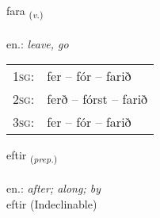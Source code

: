 \documentclass[frontgrid, backgrid]{flacards}\usepackage[]{graphicx}\usepackage[]{xcolor}
\begin{document}
\renewcommand{\flhead}{\vskip5pt \fboxsep=0pt {\small\bfseries\footnotesize Sagnorð | Verb}}
\renewcommand{\fcfoot}{\vskip5pt \fboxsep=0pt \hspace{2pt}{\small\bfseries\footnotesize 1K}}

\renewcommand{\blhead}{\vskip5pt {\small\bfseries\footnotesize Sagnorð | Verb }}
\renewcommand{\bcfoot}{\vskip5pt \hspace{2pt}{\small\bfseries\footnotesize 1K}}


{fara \small{\textsubscript{(\textit{v.})}} \\[1ex] %
\textphonetic{[faːra]} \\
en.: \emph{leave, go} \\  [2ex]
\renewcommand*{\arraystretch}{0.8}
\begin{tabular}{p{1cm}l}
\textsc{1sg}: & fer -- fór -- farið \\ 
\textsc{2sg}: & ferð -- fórst -- farið \\ 
\textsc{3sg}: & fer -- fór -- farið \\ 
\end{tabular}
}


\renewcommand{\flhead}{\vskip5pt \fboxsep=0pt {\small\bfseries\footnotesize Forsetning | Preposition}}
\renewcommand{\fcfoot}{\vskip5pt \fboxsep=0pt \hspace{2pt}{\small\bfseries\footnotesize 1K}}

\renewcommand{\blhead}{\vskip5pt {\small\bfseries\footnotesize Forsetning | Preposition }}
\renewcommand{\bcfoot}{\vskip5pt \hspace{2pt}{\small\bfseries\footnotesize 1K}}


{eftir \small{\textsubscript{(\textit{prep.})}} \\[1ex]
\textphonetic{[ɛftɪr]} \\
en.: \emph{after; along; by} \\  [2ex]
eftir (Indeclinable)}

\renewcommand{\flhead}{\vskip5pt \fboxsep=0pt {\small\bfseries\footnotesize Sagnorð | Verb}}
\renewcommand{\fcfoot}{\vskip5pt \fboxsep=0pt \hspace{2pt}{\small\bfseries\footnotesize 1K}}
\end{document}
